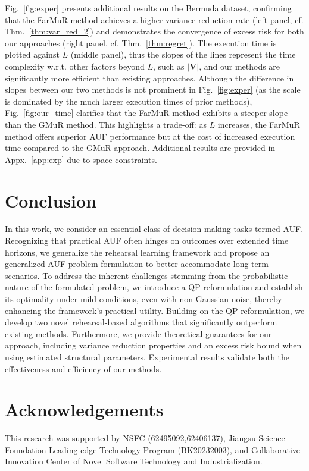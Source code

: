 \documentclass{article}
\theoremstyle{plain}
\theoremstyle{definition}
\theoremstyle{remark}
\def \V {\mathbf{V}}
\def \V {\mathbf{V}}
\begin{document}
Fig.~\ref{fig:exper} presents additional results on the Bermuda dataset, confirming that the FarMuR method achieves a higher variance reduction rate (left panel, cf. Thm.~\ref{thm:var_red_2}) and demonstrates the convergence of excess risk for both our approaches (right panel, cf. Thm.~\ref{thm:regret}).
The execution time is plotted against \(L\) (middle panel), thus the slopes of the lines represent the time complexity w.r.t. other factors beyond \(L\), such as \(|\V|\), and our methods are significantly more efficient than existing approaches.
Although the difference in slopes between our two methods is not prominent in Fig.~\ref{fig:exper} (as the scale is dominated by the much larger execution times of prior methods), Fig.~\ref{fig:our_time} clarifies that the FarMuR method exhibits a steeper slope than the GMuR method.
This highlights a trade-off: as \(L\) increases, the FarMuR method offers superior AUF performance but at the cost of increased execution time compared to the GMuR approach. 
Additional results are provided in Appx.~\ref{app:exp} due to space constraints.



\section{Conclusion}
\label{sec:conclusion}
In this work, we consider an essential class of decision-making tasks termed AUF.
Recognizing that practical AUF often hinges on outcomes over extended time horizons, we generalize the rehearsal learning framework and propose an generalized AUF problem formulation to better accommodate long-term scenarios.
To address the inherent challenges stemming from the probabilistic nature of the formulated problem, we introduce a QP reformulation and establish its optimality under mild conditions, even with non-Gaussian noise, thereby enhancing the framework's practical utility. 
Building on the QP reformulation, we develop two novel rehearsal-based algorithms that significantly outperform existing methods.
Furthermore, we provide theoretical guarantees for our approach, including variance reduction properties and an excess risk bound when using estimated structural parameters.
Experimental results validate both the effectiveness and efficiency of our methods.

\section*{Acknowledgements}
This research was supported by NSFC (62495092,62406137), Jiangsu Science Foundation Leading-edge Technology Program (BK20232003), and Collaborative Innovation Center of Novel Software Technology and Industrialization.
\end{document}
